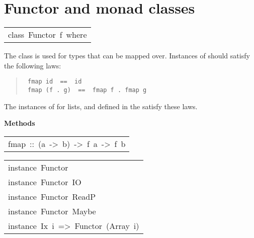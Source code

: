 \section{Functor and monad classes
}
\begin{haddockdesc}
\item[\begin{tabular}{@{}l}
class\ Functor\ f\ where
\end{tabular}]\haddockbegindoc
The  class is used for types that can be mapped over.
Instances of  should satisfy the following laws:
\par
\begin{quote}
{\haddockverb\begin{verbatim}
 fmap id  ==  id
 fmap (f . g)  ==  fmap f . fmap g
\end{verbatim}}
\end{quote}
The instances of  for lists,  and 
defined in the  satisfy these laws.
\par

\haddockpremethods{}\textbf{Methods}
\begin{haddockdesc}
\item[\begin{tabular}{@{}l}
fmap\ ::\ (a\ ->\ b)\ ->\ f\ a\ ->\ f\ b
\end{tabular}]
\end{haddockdesc}
\end{haddockdesc}
\begin{haddockdesc}
\item[\begin{tabular}{@{}l}
instance\ Functor\ {\char 91}{\char 93}\\instance\ Functor\ IO\\instance\ Functor\ ReadP\\instance\ Functor\ Maybe\\instance\ Ix\ i\ =>\ Functor\ (Array\ i)
\end{tabular}]
\end{haddockdesc}
